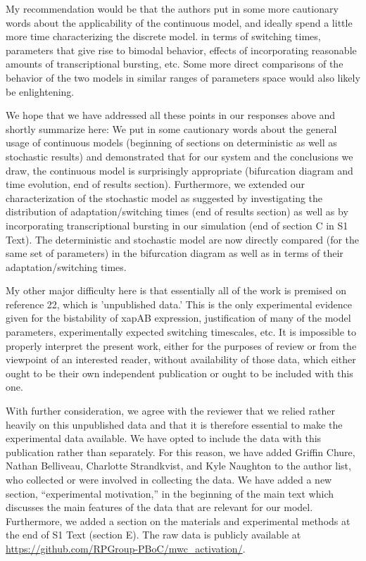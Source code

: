 \documentclass[11pt,letterpaper]{article}
\begin{document}
\begin{review}
My recommendation would be that the authors put in some more cautionary words about the applicability of the continuous model, and ideally spend a little more time characterizing the discrete model. in terms of switching times, parameters that give rise to bimodal behavior, effects of incorporating reasonable amounts of transcriptional bursting, etc. Some more direct comparisons of the behavior of the two models in similar ranges of parameters space would also likely be enlightening.
\end{review}

\begin{response}
We hope that we have addressed all these points in our responses above
and shortly summarize here: We put in some cautionary words about the
general usage of continuous models (beginning of sections on deterministic as well as stochastic results) and demonstrated that for our system
and the conclusions we draw, the continuous model is surprisingly appropriate (bifurcation diagram and time evolution, end of results section).
Furthermore, we extended our characterization of the stochastic model as
suggested by investigating the distribution of adaptation/switching
times (end of results section) as well as by incorporating transcriptional bursting in our
simulation (end of section C in S1 Text). The deterministic and stochastic model are now directly
compared (for the same set of parameters) in the bifurcation diagram as
well as in terms of their adaptation/switching times.
\end{response}

\begin{review}
My other major difficulty here is that essentially all of the work is
premised on reference 22, which is 'unpublished data.' This is the only
experimental evidence given for the bistability of xapAB expression,
justification of many of the model parameters, experimentally expected
switching timescales, etc. It is impossible to properly interpret the
present work, either for the purposes of review or from the viewpoint of
an interested reader, without availability of those data, which either
ought to be their own independent publication or ought to be included
with this one.
\end{review}

\begin{response}
With further consideration, we agree with the reviewer that we relied
rather heavily on this unpublished data and that it is therefore
essential to make the experimental data available.
We have opted to include the data with this publication rather than
separately. For this reason, we have added Griffin Chure, Nathan Belliveau, Charlotte Strandkvist, and Kyle Naughton to the author list, who collected or were involved in collecting the data. We have added a new section, ``experimental motivation,'' in
the beginning of the main text which discusses the main features of the
data that are relevant for our model. Furthermore, we added a section on
the materials and experimental methods at the end of S1 Text (section
E).
The raw data is
publicly available at \url{https://github.com/RPGroup-PBoC/mwc_activation/}.
\end{response}




\end{document}
